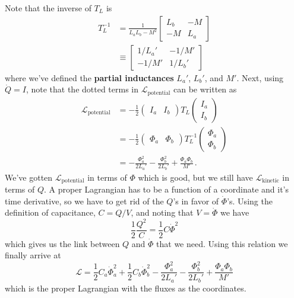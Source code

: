 Note that the inverse of $T_L$ is
\begin{align}
  T_L^{-1}
  &= \frac{1}{L_a L_b - M^2}
  \left[ \begin{array}{cc}
    L_b & -M \\ -M & L_a
  \end{array} \right] \nonumber \\
  &\equiv \left[ \begin{array}{cc}
    1/L_a' & -1/M' \\ -1/M' & 1/L_b'
  \end{array} \right]
\end{align}
where we've defined the \textbf{partial inductances} $L_a'$, $L_b'$, and $M'$.
Next, using $\dot{Q}=I$, note that the dotted terms in $\mathcal{L}_\text{potential}$ can be written as
\begin{align*}
  \mathcal{L}_\text{potential}
  &= -\frac{1}{2}
    \begin{pmatrix} I_a & I_b \end{pmatrix} T_L \begin{pmatrix} I_a \\ I_b \end{pmatrix} \\
  &= -\frac{1}{2}
    \begin{pmatrix} \Phi_a & \Phi_b \end{pmatrix}
    T_L^{-1}
    \begin{pmatrix} \Phi_a \\ \Phi_b \end{pmatrix} \\
  &= - \frac{\Phi_a^2}{2 L_a'} - \frac{\Phi_b^2}{2 L_b'} + \frac{\Phi_a \Phi_b}{M'}
  \, .
\end{align*}
We've gotten $\mathcal{L}_\text{potential}$ in terms of $\Phi$ which is good, but we still have $\mathcal{L}_\text{kinetic}$ in terms of $Q$.
A proper Lagrangian has to be a function of a coordinate and it's time derivative, so we have to get rid of the $Q$'s in favor of $\dot \Phi$'s.
Using the definition of capacitance, $C = Q/V$, and noting that $V = \dot \Phi$ we have
\begin{equation*}
  \frac{1}{2}\frac{Q^2}{C} = \frac{1}{2}C \dot{\Phi}^2
\end{equation*}
which gives us the link between $Q$ and $\dot \Phi$ that we need.
Using this relation we finally arrive at
\begin{equation}
  \mathcal{L} =
  \frac{1}{2}C_a \dot{\Phi}_a^2 + \frac{1}{2}C_b \dot{\Phi}_b^2
  - \frac{\Phi_a^2}{2L_a'} - \frac{\Phi_b^2}{2L_b'}
  + \frac{\Phi_a \Phi_b}{M'}
\end{equation}
which is the proper Lagrangian with the fluxes as the coordinates.

